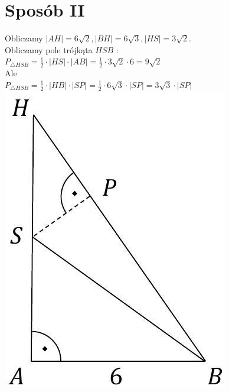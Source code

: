 \documentclass[10pt]{article}
\begin{document}
\section*{Sposób II}
Obliczamy $|A H|=6 \sqrt{2},|B H|=6 \sqrt{3},|H S|=3 \sqrt{2}$.\\
Obliczamy pole trójkąta $H S B$ :\\
$P_{\triangle H S B}=\frac{1}{2} \cdot|H S| \cdot|A B|=\frac{1}{2} \cdot 3 \sqrt{2} \cdot 6=9 \sqrt{2}$\\
Ale\\
$P_{\triangle H S B}=\frac{1}{2} \cdot|H B| \cdot|S P|=\frac{1}{2} \cdot 6 \sqrt{3} \cdot|S P|=3 \sqrt{3} \cdot|S P|$\\
\includegraphics[max width=\textwidth, center]{2025_02_07_dcb3d059df06a3930b0ag-34(2)}
\end{document}
